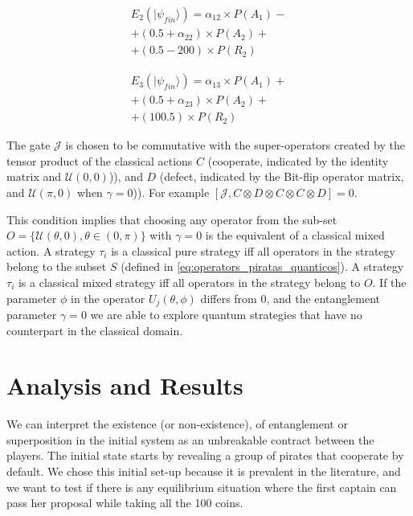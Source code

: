 \documentclass[10pt,twocolumn]{llncs}
\begin{document}
\begin{equation}
\begin{split}
E_{2}(\vert\psi_{fin}\rangle)=\alpha_{12}\times P(A_{1}) - \\
 + (0.5 + \alpha_{22})\times P(A_{2})  + \\ 
+(0.5-200)\times P(R_{2})
\end{split}
\label{eq:pirates_payoff32:2}
\end{equation}

\begin{equation}
\begin{split}
E_{3}(\vert\psi_{fin}\rangle)=\alpha_{13}\times P(A_{1}) + \\
 + (0.5 + \alpha_{23})\times P(A_{2})   + \\
 + (100.5)\times P(R_{2}) 
\end{split}
\label{eq:pirates_payoff32:3}
\end{equation}



The gate $\mathcal{J}$ is chosen to be commutative with the super-operators created by the tensor product of the classical actions $C$ (cooperate, indicated by the identity matrix and $\mathcal{U}(0,0)$)), and $D$ (defect, indicated by the Bit-flip operator matrix, and $\mathcal{U}(\pi,0)$ when $\gamma = 0$)). For example $[ \mathcal{J} , C \otimes D \otimes C \otimes C \otimes D ] = 0 $.


This condition implies that choosing any operator from the sub-set $O = \{ \mathcal{U} ( \theta , 0) , \theta \in (0, \pi) \}$ with $\gamma = 0$ is the equivalent of a classical mixed action. A strategy $\tau_{i}$ is a classical pure strategy iff all operators in the strategy belong to the subset $S$ (defined in \ref{eq:operators_piratas_quanticos}). A strategy $\tau_{i}$ is a classical mixed strategy iff all operators in the strategy belong to $O$.
If the parameter $\phi$ in the operator $U_{j}(\theta ,\phi)$ differs from $0$, and the entanglement parameter $\gamma = 0$ we are able to explore quantum strategies that have no counterpart in the classical domain\cite{Eisert2008}.









\section{Analysis and Results}
\label{sec:pirate_results}
We can interpret the existence (or non-existence), of entanglement or superposition in the initial system as an unbreakable contract between the players\cite{Piotrowski}. The initial state starts by revealing a group of pirates that cooperate by default. We chose this initial set-up because it is prevalent in the literature\cite{Eisert2008}\cite{Fra2011a}\cite{Fra2011}\cite{Letters2002}, and we want to test if there is any equilibrium situation where the first captain can pass her proposal while taking all the 100 coins.
\end{document}
